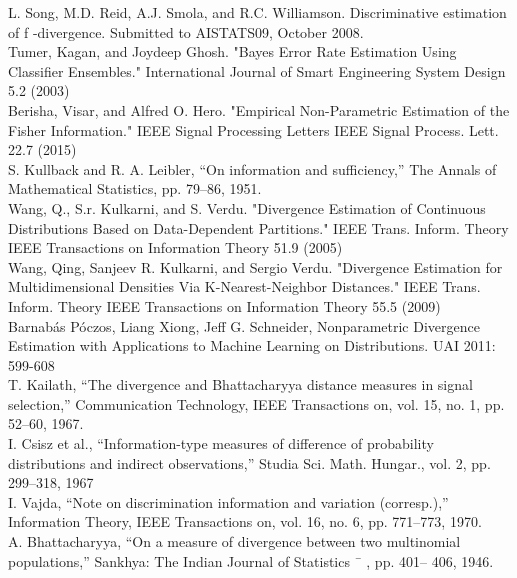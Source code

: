 \documentclass{article}
\begin{document}
	\noindent [23] L. Song, M.D. Reid, A.J. Smola, and R.C. Williamson. Discriminative estimation of f -divergence. 
	\indent Submitted to AISTATS09, October 2008.
	\\ [0.5ex]
	
	\noindent [24] Tumer, Kagan, and Joydeep Ghosh. "Bayes Error Rate Estimation Using Classifier Ensembles." 
	\indent International Journal of Smart Engineering System Design 5.2 (2003)
	\\ [0.5ex]
	
	\noindent [25] Berisha, Visar, and Alfred O. Hero. "Empirical Non-Parametric Estimation of the Fisher 
	\indent Information." IEEE Signal Processing Letters IEEE Signal Process. Lett. 22.7 (2015)
	\\ [0.5ex]
	
	\noindent [26] S. Kullback and R. A. Leibler, “On information and sufficiency,” The	Annals of Mathematical 
	\indent Statistics, pp. 79–86, 1951.
	\\ [0.5ex]
	
	\noindent [27] Wang, Q., S.r. Kulkarni, and S. Verdu. "Divergence Estimation of Continuous Distributions 
	\indent Based on Data-Dependent Partitions." IEEE Trans. Inform. Theory IEEE Transactions on 
	\indent Information Theory 51.9 (2005)
	\\ [0.5ex]
	
	\noindent [28] Wang, Qing, Sanjeev R. Kulkarni, and Sergio Verdu. "Divergence Estimation for Multidimensional 
	\indent Densities Via K-Nearest-Neighbor Distances." IEEE Trans. Inform. Theory IEEE Transactions 
	\indent on Information Theory 55.5 (2009)
	\\ [0.5ex]

	\noindent [29] Barnabás Póczos, Liang Xiong, Jeff G. Schneider, Nonparametric Divergence Estimation with 
	\indent Applications to Machine Learning on Distributions. UAI 2011: 599-608
	\\ [0.5ex]
	
	\noindent [30] T. Kailath, “The divergence and Bhattacharyya distance measures in signal selection,” Communication 
	\indent Technology, IEEE Transactions on,	vol. 15, no. 1, pp. 52–60, 1967.
	\\ [0.5ex]
	
	\noindent [31] I. Csisz et al., “Information-type measures of difference of probability	distributions and indirect 
	\indent observations,” Studia Sci. Math. Hungar.,
	vol. 2, pp. 299–318, 1967
	\\ [0.5ex]
	
	\noindent [32] I. Vajda, “Note on discrimination information and variation (corresp.),”	Information Theory, IEEE 
	\indent Transactions on, vol. 16, no. 6, pp. 771–773, 1970.
	\\ [0.5ex]
	
	\noindent [33] A. Bhattacharyya, “On a measure of divergence between two multinomial populations,” Sankhya: 
	\indent The Indian Journal of Statistics ¯ , pp. 401–
	406, 1946.
\end{document}
